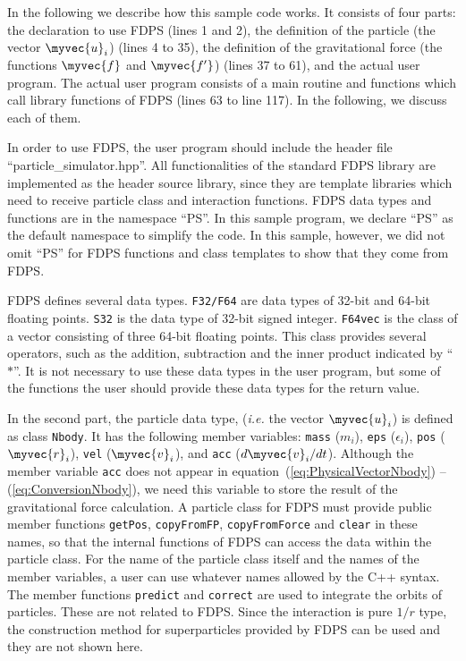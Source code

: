 In the following we describe how this sample code works.  It consists
of four parts: the declaration to use FDPS (lines 1 and 2), the
definition of the particle (the vector $\myvec{u}_i$) (lines 4 to 35),
the definition of the gravitational force (the functions $\myvec{f}$
and $\myvec{f'}$) (lines 37 to 61), and the actual user program.  The
actual user program consists of a main routine and functions which
call library functions of FDPS (lines 63 to line 117). In the
following, we discuss each of them.



In order to use FDPS, the user program should
include the header file ``particle\_simulator.hpp''.
All functionalities of  the standard FDPS library are
implemented  as the header source library, since they are 
template libraries which need to receive particle class and
interaction functions.  FDPS data types and functions are in  the namespace
``PS''. In this sample program, we declare ``PS''  as the default
namespace to simplify the code. In this sample, however, we did not
omit ``PS'' for FDPS functions and class templates to show that they
come from FDPS.

FDPS defines several data types. \texttt{F32/F64} are data types of
32-bit and 64-bit floating points. \texttt{S32} is the data type of
32-bit signed integer.
\texttt{F64vec} is the class of a vector consisting of three 64-bit
floating points. This class provides several operators, such as the
addition, subtraction and the inner product indicated by ``$*$''.  It
is not necessary to use these data types in the user program, but some
of the functions the user should provide these data types for the
return value.


In the second part, the particle data type, ({\it i.e.} the vector
$\myvec{u}_i$) is defined as class \texttt{Nbody}. It has the
following member variables: \texttt{mass} ($m_i$), \texttt{eps}
($\epsilon_i$), \texttt{pos} ($\myvec{r}_i$), \texttt{vel}
($\myvec{v}_i$), and \texttt{acc} ($d\myvec{v}_i/dt$). Although the
member variable \texttt{acc} does not appear in
equation~(\ref{eq:PhysicalVectorNbody}) -- (\ref{eq:ConversionNbody}),
we need this variable to store the result of the gravitational force
calculation. A particle class for FDPS must provide public member
functions \texttt{getPos}, \texttt{copyFromFP},
\texttt{copyFromForce} and \texttt{clear} in these names, so that the internal functions
of FDPS can access the data within the particle class.  For the name
of the particle class itself and the names of the member variables, a
user can use whatever names allowed by the C++ syntax.  The member
functions \texttt{predict} and \texttt{correct} are used to integrate
the orbits of particles. These are not related to FDPS.  Since the
interaction is pure $1/r$ type, the construction method for
superparticles provided by FDPS can be used and they are not shown
here.

